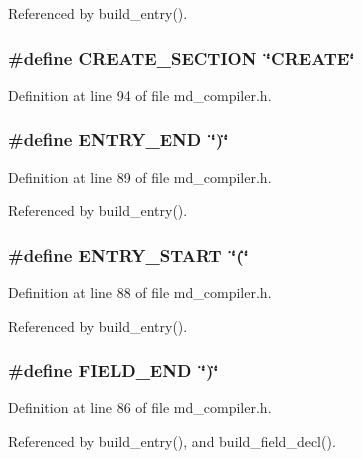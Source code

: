 Referenced by build\_\-entry().
\subsubsection{\setlength{\rightskip}{0pt plus 5cm}\#define CREATE\_\-SECTION~\char`\"{}CREATE\char`\"{}}\label{md__compiler_8h_99eda2c85fadad91c0314c01cb00276a}




Definition at line 94 of file md\_\-compiler.h.
\subsubsection{\setlength{\rightskip}{0pt plus 5cm}\#define ENTRY\_\-END~\char`\"{})\char`\"{}}\label{md__compiler_8h_a979764be06bb7bdf7f69857b1600713}




Definition at line 89 of file md\_\-compiler.h.

Referenced by build\_\-entry().
\subsubsection{\setlength{\rightskip}{0pt plus 5cm}\#define ENTRY\_\-START~\char`\"{}(\char`\"{}}\label{md__compiler_8h_caed8d0d130b5f5ae31d159672796994}




Definition at line 88 of file md\_\-compiler.h.

Referenced by build\_\-entry().
\subsubsection{\setlength{\rightskip}{0pt plus 5cm}\#define FIELD\_\-END~\char`\"{})\char`\"{}}\label{md__compiler_8h_135c2f21d955e76e6b67a2ffb392fd43}




Definition at line 86 of file md\_\-compiler.h.

Referenced by build\_\-entry(), and build\_\-field\_\-decl().
